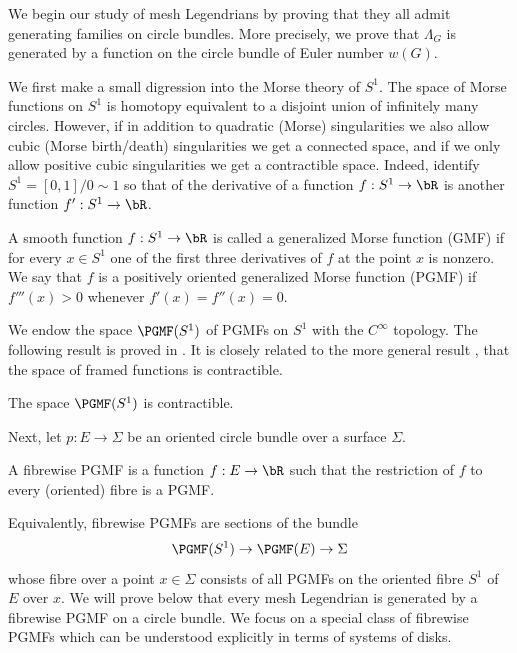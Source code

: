 We begin our study of mesh Legendrians by proving that they all admit generating families on circle bundles. More precisely, we prove that $\Lambda_G$ is generated by a function on the circle bundle of Euler number $w(G)$.

We first make a small digression into the Morse theory of $S^1$. The space of Morse functions on $S^1$ is homotopy equivalent to a disjoint union of infinitely many circles. However, if in addition to quadratic (Morse) singularities we also allow cubic (Morse birth/death) singularities we get a connected space, and if we only allow positive cubic singularities we get a contractible space. Indeed, identify $S^1 = [0,1]/ 0 \sim 1$ so that of the derivative of a function $f:S^1 \to \bR$ is another function $f':S^1 \to \bR$.
\begin{definition}
A smooth function $f:S^1 \to \bR$ is called a generalized Morse function (GMF) if for every $x \in S^1$ one of the first three derivatives of $f$ at the point $x$ is nonzero. We say that $f$ is a positively oriented generalized Morse function (PGMF) if $f'''(x)>0$ whenever $f'(x)=f''(x)=0$. \end{definition}

We endow the space $\PGMF(S^1)$ of PGMFs on $S^1$ with the $C^\infty$ topology. The following result is proved in \cite{IK93}. It is closely related to the more general result \cite{I87}, \cite{EM12} that the space of framed functions is contractible.

\begin{theorem}\label{contractibility}
The space $\PGMF(S^1)$ is contractible.
\end{theorem}

Next, let $p: E \to \Sigma$ be an oriented circle bundle over a surface $\Sigma$.

\begin{definition}
A fibrewise PGMF is a function $f:E \to \bR$ such that the restriction of $f$ to every (oriented) fibre is a PGMF.
\end{definition}

Equivalently, fibrewise PGMFs are sections of the bundle
\[
\PGMF(S^1) \to \PGMF(E) \to \Sigma
\]
whose fibre over a point $x \in \Sigma$ consists of all PGMFs on the oriented fibre $S^1$ of $E$ over $x$. We will prove below that every mesh Legendrian is generated by a fibrewise PGMF on a circle bundle. We focus on a special class of fibrewise PGMFs which can be understood explicitly in terms of systems of disks.

